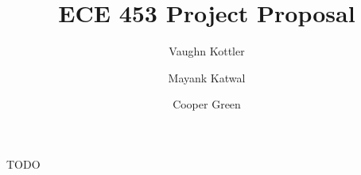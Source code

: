 \documentclass{article}
\title{ECE 453 Project Proposal}
\author{Vaughn Kottler}
\author{Mayank Katwal}
\author{Cooper Green}
\begin{document}
TODO
\end{document}
